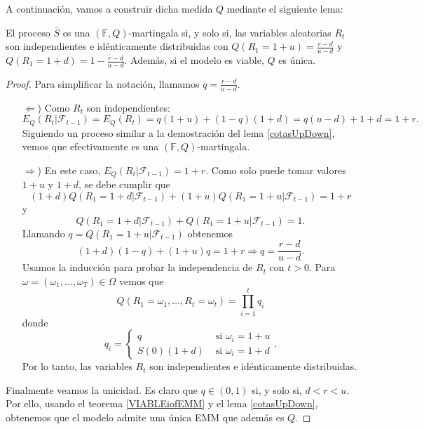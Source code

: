 A continuación, vamos a construir dicha medida $ Q $ mediante el siguiente lema:
\begin{lemaBox}\label{cotasUpDown}
El proceso $ \bar{S} $ es una $ (\mathbb{F},Q) $-martingala si, y solo si, las variables aleatorias $ R_t $ son independientes e idénticamente distribuidas con $ Q(R_1 = 1+u) = \frac{r-d}{u-d}$ y $ Q(R_1 = 1+d) = 1- \frac{r-d}{u-d} $. Además, si el modelo es viable, $ Q $ es única.
\end{lemaBox} 
\begin{proof}
Para simplificar la notación, llamamos $ q =  \frac{r-d}{u-d}$.
\begin{itemize}
\item[$ \Longleftarrow $)] Como $ R_t $ son independientes:
\[
E_Q(R_t | \mathcal{F}_{t-1}) = E_Q(R_t) = q(1+u) + (1-q)(1+d) = q(u-d) + 1 +d = 1+r.
\]
Siguiendo un proceso similar a la demostración del lema \ref{cotasUpDown}, vemos que efectivamente es una $ (\mathbb{F},Q) $-martingala.
\item[$ \Longrightarrow $)] En este caso, $ E_Q(R_t | \mathcal{F}_{t-1}) = 1+r $. Como solo puede tomar valores $ 1+u $ y $ 1+d $, se debe cumplir que
\[
(1+d)Q(R_1 = 1+d | \mathcal{F}_{t-1}) + (1+u)Q(R_1 = 1+u | \mathcal{F}_{t-1}) = 1+r
\]
y
\[
Q(R_1 = 1+d | \mathcal{F}_{t-1}) + Q(R_1 = 1+u | \mathcal{F}_{t-1}) = 1.
\]
Llamando $ q =  Q(R_1 = 1+u | \mathcal{F}_{t-1})$ obtenemos
\[
(1+d)(1-q) + (1+u)q = 1+r \Longrightarrow q = \frac{r-d}{u-d}.
\]
Usamos la inducción para probar la independencia de $ R_t $ con $ t >0 $. Para $ \omega = (\omega_1,\dots,\omega_T) \in \Omega $ vemos que
\[
Q(R_1 = \omega_1,\dots,R_t = \omega_t) = \prod_{i=1}^{t}q_i
\]
donde
\[
q_i =  \begin{cases}
q & \text{ si } \omega_i = 1+u\\
S(0)(1+d) & \text{ si } \omega_i = 1+d
\end{cases}.
\]
Por lo tanto, las variables $ R_t $ son independientes e idénticamente distribuidas.
\end{itemize}

Finalmente veamos la unicidad. Es claro que $ q \in (0,1) $ si, y solo si, $ d<r<u $. Por ello, usando el teorema \ref{VIABLEiofEMM} y el lema \ref{cotasUpDown}, obtenemos que el modelo admite una única EMM que además es $ Q $.
\end{proof}

